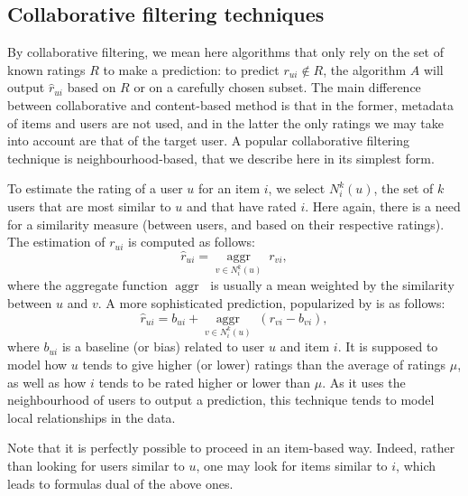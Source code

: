 \documentclass{llncs}
\newcommand{\aggr}[1]{\underset{#1}{\operatorname{aggr}}\;}
\begin{document}
\subsection{Collaborative filtering techniques}
\label{CollabFil}
By collaborative filtering, we mean here algorithms that only rely on the set
of known ratings $R$ to make a prediction: to predict $r_{ui} \notin R$, the
algorithm $A$ will output $\hat{r}_{ui}$ based on $R$ or on a carefully chosen
subset.  The main difference between collaborative and content-based method is
that in the former, metadata of items and users are not used, and in the latter
the only ratings we may take into account are that of the target user.  A
popular collaborative filtering technique is neighbourhood-based, that we
describe here in its simplest form.

To estimate the rating of a user $u$ for an item $i$, we
select $N_i^k(u)$, the set of $k$ users that are most similar to $u$ and that
have rated $i$. Here again, there is a need for a similarity measure (between
users, and based on their respective ratings). The estimation of $r_{ui}$ is computed as follows:
$$\hat{r}_{ui} = \aggr{v \in N_i^k(u)}r_{vi},$$
where the aggregate function $\aggr{}$ is usually a mean weighted by the similarity between $u$
and $v$. A more sophisticated prediction, popularized by
\cite{BelKorSIGKDD2007} is as follows:
$$\hat{r}_{ui} = b_{ui} + \aggr{v \in N_i^k(u)}(r_{vi} - b_{vi}),$$
where $b_{ui}$ is a baseline (or bias) related to user $u$ and item $i$. It
is supposed to model how $u$ tends to give higher (or lower) ratings than the
average of ratings $\mu$, as well as how $i$ tends to be rated higher or lower
than $\mu$. As it uses the neighbourhood of users to output a prediction, this
technique tends to model local relationships in the data.

Note that it is perfectly possible to proceed in an item-based way. Indeed,
rather than looking for users similar to $u$, one may look for items similar to
$i$, which leads to formulas dual of the above ones. 
\end{document}
